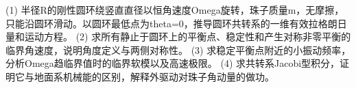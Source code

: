 (1) 半径R的刚性圆环绕竖直直径以恒角速度Omega旋转，珠子质量m，无摩擦，只能沿圆环滑动。以圆环最低点为theta=0，推导圆环共转系的一维有效拉格朗日量和运动方程。
(2) 求所有静止于圆环上的平衡点、稳定性和产生对称非零平衡的临界角速度，说明角度定义与两侧对称性。
(3) 求稳定平衡点附近的小振动频率，分析Omega趋临界值时的临界软模以及高速极限。
(4) 求共转系Jacobi型积分，证明它与地面系机械能的区别，解释外驱动对珠子角动量的做功。

